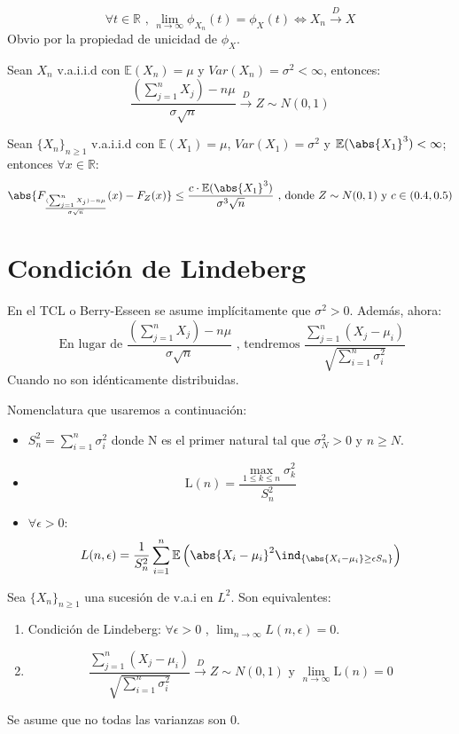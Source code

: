 \documentclass{apuntes}
\begin{document}
\begin{theorem}

$$\forall t \in \mathbb{R} \text{ , } \lim_{n\rightarrow \infty} \phi_{X_n}(t)=\phi_X(t) \Leftrightarrow X_n \stackrel{D}{\rightarrow} X$$
Obvio por la propiedad de unicidad de $\phi_X$.
\end{theorem}

\begin{theorem}
Sean $X_n$ v.a.i.i.d con $\mathbb{E}(X_n)=\mu$ y $Var(X_n)=\sigma^2<\infty$, entonces:
\[
\frac{(\sum_{j=1}^{n}X_j)-n\mu}{\sigma \sqrt{n}} \stackrel{D}{\rightarrow} Z\sim N(0,1)
\]
\end{theorem}

\begin{theorem}
Sean $\{X_n\}_{n\geq 1}$ v.a.i.i.d con $\mathbb{E}(X_1)=\mu$, $Var(X_1)=\sigma^2$ y $\mathbb{E}(\abs{X_1}^3)<\infty$; entonces $\forall x \in \mathbb{R}$:
\[
\abs{F_{\frac{(\sum_{j=1}^{n}X_j)-n\mu}{\sigma \sqrt{n}}}(x)-F_Z(x)} \leq \frac{c\cdot \mathbb{E}(\abs{X_1}^3)}{\sigma^3\sqrt{n}} \text{ , donde $Z\sim N(0,1)$ y $c\in (0.4,0.5)$}
\]
\end{theorem}

\section{Condición de Lindeberg}

En el TCL o Berry-Esseen se asume implícitamente que $\sigma^2 >0$. Además, ahora:
\[
\text{ En lugar de } \frac{(\sum_{j=1}^{n}X_j)-n\mu}{\sigma \sqrt{n}} \text{ , tendremos } \frac{\sum_{j=1}^{n}(X_j-\mu_i)}{\sqrt{\sum_{i=1}^{n}\sigma_i^2}}
\]
Cuando no son idénticamente distribuidas.

Nomenclatura que usaremos a continuación:
\begin{itemize}
\item $S^2_n=\sum_{i=1}^{n}\sigma_i^2$ donde N es el primer natural tal que $\sigma^2_N>0$ y $n\geq N$.
\item \[
\text{\~{L}}(n)=\frac{\max_{1\leq k \leq n}\sigma^2_k}{S^2_n}
\]
\item $\forall \epsilon >0$: $$L(n, \epsilon)=\frac{1}{S_n^2} \sum_{i=1}^{n}\mathbb{E}\left( \abs{X_i-\mu_i}^2 \ind_{\{\abs{X_i-\mu_i}\geq \epsilon S_n\}} \right)$$
\end{itemize}

\begin{theorem}
Sea $\{X_n\}_{n\geq 1}$ una sucesión de v.a.i en $L^2$. Son equivalentes:
\begin{enumerate}
\item Condición de Lindeberg: $\forall \epsilon >0$ , $\lim_{n\rightarrow \infty} L(n, \epsilon)=0$.
\item 
\[
\frac{\sum_{j=1}^{n}(X_j-\mu_i)}{\sqrt{\sum_{i=1}^{n}\sigma_i^2}} \stackrel{D}{\rightarrow} Z \sim N(0,1) \text{ y } \lim_{n \rightarrow \infty} \text{\~{L}}(n)=0
\]
\end{enumerate}
Se asume que no todas las varianzas son 0.

\end{theorem}
\end{document}

